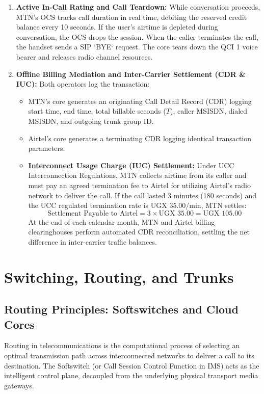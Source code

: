 \documentclass[12pt,a4paper]{report}
\begin{document}
\begin{enumerate}
    \item \textbf{Active In-Call Rating and Call Teardown:}
    While conversation proceeds, MTN's OCS tracks call duration in real time, debiting the reserved credit balance every 10 seconds. If the user's airtime is depleted during conversation, the OCS drops the session. When the caller terminates the call, the handset sends a SIP `BYE` request. The core tears down the QCI 1 voice bearer and releases radio channel resources.

    \item \textbf{Offline Billing Mediation and Inter-Carrier Settlement (CDR \& IUC):}
    Both operators log the transaction:
    \begin{itemize}
        \item MTN's core generates an originating Call Detail Record (CDR) logging start time, end time, total billable seconds ($T$), caller MSISDN, dialed MSISDN, and outgoing trunk group ID.
        \item Airtel's core generates a terminating CDR logging identical transaction parameters.
        \item \textbf{Interconnect Usage Charge (IUC) Settlement:} Under UCC Interconnection Regulations, MTN collects airtime from its caller and must pay an agreed termination fee to Airtel for utilizing Airtel's radio network to deliver the call. If the call lasted 3 minutes (180 seconds) and the UCC regulated termination rate is $\text{UGX } 35.00/\text{min}$, MTN settles:
        \[ \text{Settlement Payable to Airtel} = 3 \times \text{UGX } 35.00 = \text{UGX } 105.00 \]
        At the end of each calendar month, MTN and Airtel billing clearinghouses perform automated CDR reconciliation, settling the net difference in inter-carrier traffic balances.
    \end{itemize}
\end{enumerate}

\chapter{Switching, Routing, and Trunks}

\section{Routing Principles: Softswitches and Cloud Cores}
Routing in telecommunications is the computational process of selecting an optimal transmission path across interconnected networks to deliver a call to its destination. The Softswitch (or Call Session Control Function in IMS) acts as the intelligent control plane, decoupled from the underlying physical transport media gateways.
\end{document}
